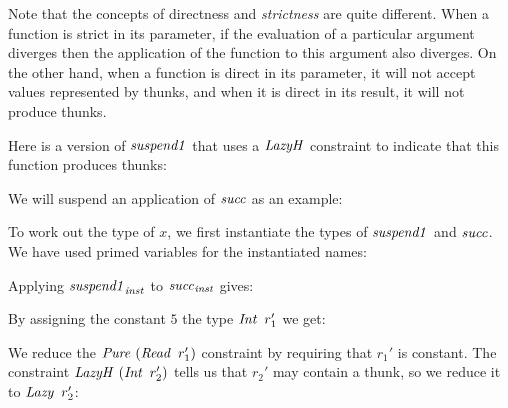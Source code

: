 Note that the concepts of directness and \emph{strictness} are quite different. When a function is strict in its parameter, if the evaluation of a particular argument diverges then the application of the function to this argument also diverges. On the other hand, when a function is direct in its parameter, it will not accept values represented by thunks, and when it is direct in its result, it will not produce thunks. 

Here is a version of $\operatorname{\mathit{suspend1}}$ that uses a $\operatorname{\mathit{LazyH}}$ constraint to indicate that this function produces thunks:


We will suspend an application of $\operatorname{\mathit{succ}}$ as an example:


To work out the type of $x$, we first instantiate the types of $\operatorname{\mathit{suspend1}}$ and $\operatorname{\mathit{succ}}$. We have used primed variables for the instantiated names:



Applying $\operatorname{\mathit{suspend1}}_{\operatorname{\mathit{inst}}}$ to $\operatorname{\mathit{succ}}_{\operatorname{\mathit{inst}}}$ gives:


By assigning the constant $5$ the type $\operatorname{\mathit{Int}} \ r_1'$ we get:


We reduce the $\iPure \ (\iRead \ r_1')$ constraint by requiring that $r_1'$ is constant. The constraint $\operatorname{\mathit{LazyH}} \ (\operatorname{\mathit{Int}} \ r_2')$ tells us that $r_2'$ may contain a thunk, so we reduce it to $\operatorname{\mathit{Lazy}} \ r_2'$:


